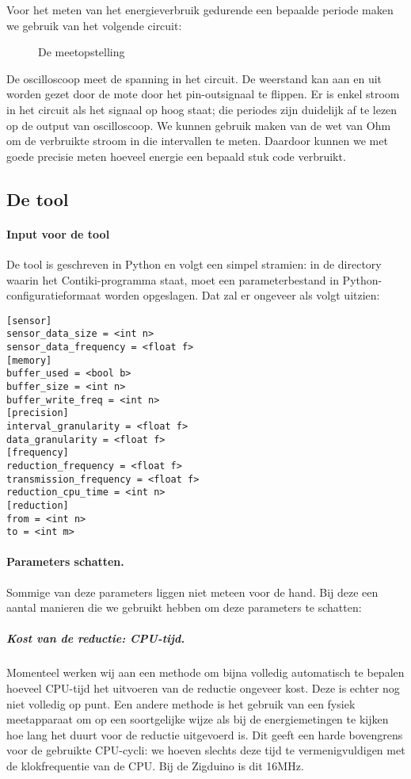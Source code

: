 \documentclass{article}
\begin{document}
Voor het meten van het energieverbruik gedurende een bepaalde periode maken we gebruik van het volgende circuit:

\begin{figure}[h]
\centering
\missingfigure{}
\caption{De meetopstelling}
\label{fig:meetopstelling}
\end{figure}

De oscilloscoop meet de spanning in het circuit. De weerstand kan aan en uit
worden gezet door de mote door het pin-outsignaal te flippen. Er is enkel stroom
in het circuit als het signaal op hoog staat; die periodes zijn duidelijk af te
lezen op de output van oscilloscoop. We kunnen gebruik maken van de wet van Ohm
om de verbruikte stroom in die intervallen te meten. Daardoor kunnen we met
goede precisie meten hoeveel energie een bepaald stuk code verbruikt.

\subsection{De tool}

\paragraph{Input voor de tool}
De tool is geschreven in Python en volgt een simpel stramien: in de directory
waarin het Contiki-programma staat, moet een parameterbestand in
Python-configuratieformaat worden opgeslagen. Dat zal er ongeveer als volgt
uitzien:

\begin{verbatim}
[sensor]
sensor_data_size = <int n>
sensor_data_frequency = <float f>
[memory]
buffer_used = <bool b>
buffer_size = <int n>
buffer_write_freq = <int n>
[precision]
interval_granularity = <float f>
data_granularity = <float f>
[frequency]
reduction_frequency = <float f>
transmission_frequency = <float f>
reduction_cpu_time = <int n>
[reduction]
from = <int n>
to = <int m>
\end{verbatim}

\paragraph{Parameters schatten.} Sommige van deze parameters liggen niet meteen
voor de hand. Bij deze een aantal manieren die we gebruikt hebben om deze
parameters te schatten:

\subparagraph{Kost van de reductie: CPU-tijd.} Momenteel werken wij aan een
methode om bijna volledig automatisch te bepalen hoeveel CPU-tijd het uitvoeren
van de reductie ongeveer kost. Deze is echter nog niet volledig op punt. Een
andere methode is het gebruik van een fysiek meetapparaat om op een soortgelijke
wijze als bij de energiemetingen te kijken hoe lang het duurt voor de reductie
uitgevoerd is. Dit geeft een harde bovengrens voor de gebruikte CPU-cycli: we
hoeven slechts deze tijd te vermenigvuldigen met de klokfrequentie van de
CPU. Bij de Zigduino is dit 16MHz.
\end{document}
